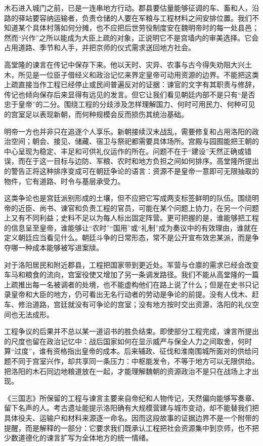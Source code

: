 木石进入城门之前，已是一连串地方行动。郡县要估量能够征调的车、畜和人，沿路的驿站要容纳运输者，负责仓储的人要在军粮与工程材料之间安排位置。我们不知道某个具体村落如何分摊，也不应把后世劳役制度安在魏明帝时的每一处县邑；然而“兴作”之所以能成为大臣上疏的对象，正说明它不是宫墙内的审美选择。它会占用道路、季节和人手，并把京师的仪式需求送回地方社会。

高堂隆的谏言在传记中保存下来。他以天时、灾异、农事与古今得失劝阻大兴土木，所见是一位臣子借经义和政治记忆来界定皇帝可动用资源的边界。不能把这类上疏直接当作工程已经停止或民间普遍反对的证据：谏官的文字有其职责与修辞，传记也倾向保存后来显得有远见的发言。但它让我们看见朝廷内部不是只有“是否忠于皇帝”的二分。围绕工程的分歧涉及怎样理解国力、何时可用民力、何种可见的宫室足以表现新朝，而何种规模会反而损伤其统治基础。

明帝一方也并非只在追逐个人享乐。新朝接续汉末战乱，需要修复和占用洛阳的政治空间；朝会、接见、储藏、宿卫与祭祀都需要具体场所。宫殿与园囿能把王朝的中心呈现为稳定、丰足和可供礼仪运作的所在。问题不在于“建设”天然正确或错误，而在于这一目标与边防、军粮、农时和地方负担之间如何排序。高堂隆所提出的警告正将这种排序变成可在朝廷争论的语言：资源不是皇帝一意即可无限抽取的物件，它有道路、时令与基层承受力。

这类争论也是宫廷派别形成的土壤，但不应把它写成两支标签鲜明的队伍。围绕明帝的近臣、尚书、谏官和负责工程的官员，可能在某个问题上协力，在另一个问题上又有不同利益；史料不足以为每人标出固定阵营。更可把握的是，谁能够把工程的信息呈至皇帝，谁能够让“农时”“国用”或“礼制”成为奏议中的有效理由，谁就在定义朝廷应当看见什么。朝廷斗争的日常形态，常不是公开宣布效忠某派，而是争夺哪一种成本能够被写进案牍。

对于洛阳居民和附近郡县，工程把国家带到更近处。军营与仓廪的需求已经会改变车马和粮食的流向，宫室役使又增加了另一条调发路径。我们不能从高堂隆的一篇上疏推出每一名被调者的处境，也不能虚构他们在路上说了什么；但是在史书只记录皇帝和大臣的地方，仍可看出无名行动者的劳动是争论的前提。没有人伐木、赶车、修治道路，宫廷就没有可争论的宫室；没有地方按时交出资源，洛阳的礼仪空间也无法成形。

工程争议的后果并不总以某一道诏书的胜负结束。即使部分工程完成，谏言所提出的尺度也留在政治记忆中：战后国家如何在显示威严与保全人力之间取舍，何时算“过度”，谁有资格指出皇帝的成本。后来辅政、征伐和淮南围城所面对的供给问题不同于宫室兴作，却共享同一条压力：中枢能发令，不等于地方可以无限供给。把洛阳的木石同边地粮道放在一起，才能理解魏朝的资源政治不是只在战场上才出现。

《三国志》所保留的工程与谏言主要来自帝纪和人物传记，天然偏向能够写奏章、留下名声的人。考古遗址能提示洛阳确有大规模营建与城市变动，却不能替我们把具体役夫、运输户和材料来源逐一命名。因而这段故事的证据边界不是一个附带的提醒，而是解释的一部分：它要求我们既承认工程把社会资源集中到京师，也不把少数道德化的谏言扩写为全体地方的统一情绪。

